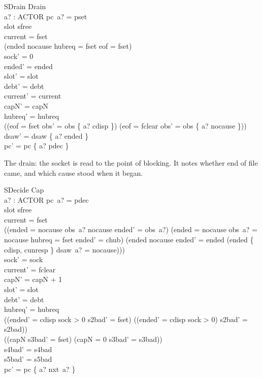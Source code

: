 \documentclass[a4paper,10pt,fleqn]{article}
\begin{document}
\begin{schema}{SDrain}
  Drain \\
  a? : ACTOR
\where
  pc~a? = pset \\
  slot \neq sfree \\
  current = fset \\
  (ended \neq nocause \lor hubreq = fset \lor eof = fset) \\
  sock' = 0 \\
  ended' = ended \\
  slot' = slot \\
  debt' = debt \\
  current' = current \\
  capN' = capN \\
  hubreq' = hubreq \\
  ((eof = fset \land obs' = obs \oplus \{ a? \mapsto cdisp \}) \lor
    (eof = fclear \land obs' = obs \oplus \{ a? \mapsto nocause \})) \\
  dsaw' = dsaw \oplus \{ a? \mapsto ended \} \\
  pc' = pc \oplus \{ a? \mapsto pdec \}
\end{schema}

The drain: the socket is read to the point of blocking.  It notes whether end of
file came, and which cause stood when it began.

\begin{schema}{SDecide}
  Cap \\
  a? : ACTOR
\where
  pc~a? = pdec \\
  slot \neq sfree \\
  current = fset \\
  ((ended = nocause \land obs~a? \neq nocause \land ended' = obs~a?) \lor
    (ended = nocause \land obs~a? = nocause \land hubreq = fset \land ended' = chub) \lor
    (ended \neq nocause \land ended' = ended \land
      \lnot (ended \in \{ cdisp, cunresp \} \land dsaw~a? = nocause))) \\
  sock' = sock \\
  current' = fclear \\
  capN' = capN + 1 \\
  slot' = slot \\
  debt' = debt \\
  hubreq' = hubreq \\
  ((ended' = cdisp \land sock > 0 \land s2bad' = fset) \lor
    (\lnot (ended' = cdisp \land sock > 0) \land s2bad' = s2bad)) \\
  ((capN  \land s3bad' = fset) \lor (capN = 0 \land s3bad' = s3bad)) \\
  s4bad' = s4bad \\
  s5bad' = s5bad \\
  pc' = pc \oplus \{ a? \mapsto nxt~a? \}
\end{schema}
\end{document}

